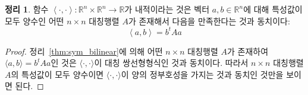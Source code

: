 \documentclass[unfonts,oneside,a4paper]{oblivoir}
\theoremstyle{definition}
\theoremstyle{theorem}
\newtheorem{theorem}[definition]{정리}
\theoremstyle{theorem}
\theoremstyle{remark}
\theoremstyle{remark}
\theoremstyle{remark}
\theoremstyle{remark}
\renewcommand{\vec}[1]{\bm{\mathit{#1}}}
\begin{document}
\begin{theorem}
    함수 $\left<\cdot, \cdot\right>: \mathbb R^n \times \mathbb R^n \rightarrow \mathbb R$가 내적이라는 것은 벡터 $\vec a, \vec b \in \mathbb R^n$에 대해 특성값이 모두 양수인 어떤 $n \times n$ 대칭행렬 $A$가 존재해서 다음을 만족한다는 것과 동치이다:
    \begin{equation*}
        \left<\vec a, \vec b\right> = \vec b^t A \vec a
    \end{equation*}
\end{theorem}

\begin{proof}
    정리~\ref{thm:sym_bilinear}에 의해 어떤 $n \times n$ 대칭행렬 $A$가 존재하여 $\langle \vec a, \vec b \rangle = \vec b^t A \vec a$인 것은 $\langle\cdot, \cdot\rangle$이 대칭 쌍선형형식인 것과 동치이다.
    따라서 $n \times n$ 대칭행렬 $A$의 특성값이 모두 양수이면 $\langle \cdot, \cdot \rangle$이 양의 정부호성을 가지는 것과 동치인 것만을 보이면 된다.


\end{proof}
\end{document}
